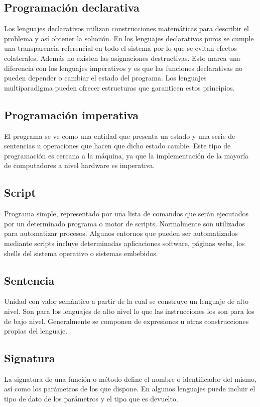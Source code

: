 \subsection {Programación declarativa}
Los lenguajes declarativos utilizan construcciones matemáticas para describir el problema y así obtener la solución.  
En los lenguajes declarativos puros se cumple una transparencia referencial en todo el sistema por lo
que se evitan efectos colaterales. Además no existen las asignaciones destructivas. Esto marca una diferencia 
con los lenguajes imperativos y es que las funciones declarativas no pueden depender o cambiar el estado del 
programa. Los lenguajes multiparadigma pueden ofrecer estructuras que garanticen estos principios.

\subsection {Programación imperativa}
El programa se ve como una entidad que presenta un estado y una serie de sentencias u operaciones que hacen que dicho estado cambie. Este tipo de programación es cercana a la 
máquina, ya que la implementación de la mayoría de computadores a nivel hardware es imperativa. 

\subsection{Script}
Programa simple, representado por una lista de comandos que serán ejecutados por un determinado programa o motor de scripts. Normalmente son utilizados
para automatizar procesos. Algunos entornos que pueden ser automatizados mediante scripts incluye 
determinadas aplicaciones software, páginas webs, los shells del sistema operativo o sistemas embebidos.

\subsection{Sentencia}
Unidad con valor semántico a partir de la cual se construye un lenguaje de alto nivel. Son para los lenguajes de alto nivel lo que las instrucciones
los son para los de bajo nivel. Generalmente se componen de expresiones u otras construcciones propias del lenguaje.

\subsection {Signatura}
La signatura de una función o método define el nombre o identificador del mismo, así como los parámetros de los que dispone. En algunos lenguajes puede incluir el tipo de dato de los parámetros 
y el tipo que es devuelto.  

